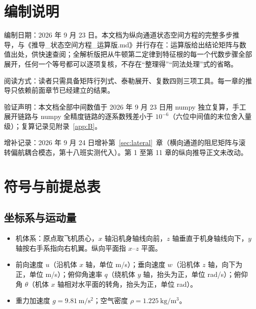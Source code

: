 \documentclass[11pt,a4paper]{ctexart}
\begin{document}

\tableofcontents
\newpage

\section*{编制说明}

编制日期：2026 年 9 月 23 日。本文档为纵向通道状态空间方程的完整多步推导，与《推导\_状态空间方程\_运算版.md》并行存在：运算版给出结论矩阵与数值出处，供快速查阅；全解析版把从牛顿第二定律到特征根的每一个代数步骤全部展开，任何一个等号都可以逐项复核，不存在“整理得”“同法处理”式的省略。

阅读方式：读者只需具备矩阵行列式、泰勒展开、复数四则三项工具。每一章的推导只依赖前面章节已经建立的结果。

验证声明：本文档全部中间数值于 2026 年 9 月 23 日用 numpy 独立复算，手工展开链路与 numpy 全精度链路的逐系数残差小于 $10^{-6}$（六位中间值的末位舍入量级）；复算记录见附录~\ref{app:B}。

增补记录：2026 年 9 月 24 日增补第~\ref{sec:lateral}~章（横向通道的阻尼矩阵与滚转偏航耦合模态，第十八班实测代入）。第 1 至第 11 章的纵向推导正文未改动。

\section{符号与前提总表}\label{sec:notation}

\subsection{坐标系与运动量}

\begin{itemize}[itemsep=2pt]
  \item 机体系：原点取飞机质心，$x$ 轴沿机身轴线向前，$z$ 轴垂直于机身轴线向下，$y$ 轴按右手系指向右机翼。纵向平面指 $x$--$z$ 平面。
  \item 前向速度 $u$（沿机体 $x$ 轴，单位 m/s）；垂向速度 $w$（沿机体 $z$ 轴，向下为正，单位 m/s）；俯仰角速率 $q$（绕机体 $y$ 轴，抬头为正，单位 rad/s）；俯仰角 $\theta$（机体 $x$ 轴相对水平面的转角，抬头为正，单位 rad）。
  \item 重力加速度 $g = 9.81\ \mathrm{m/s^2}$；空气密度 $\rho = 1.225\ \mathrm{kg/m^3}$。
\end{itemize}
\end{document}
